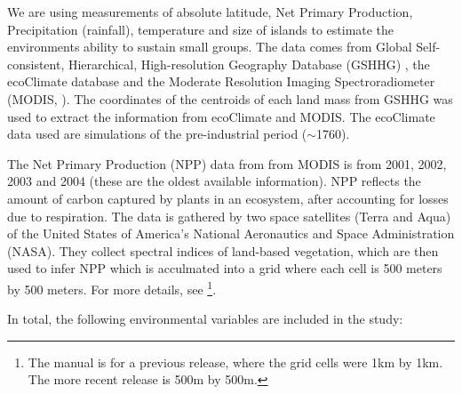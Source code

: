 \documentclass[unnumsec,webpdf,modern,medium]{oup-authoring-template}
\begin{document}
\begin{appendices}

We are using measurements of absolute latitude, Net Primary Production, Precipitation (rainfall), temperature and size of islands to estimate the environments ability to sustain small groups. The data comes from Global Self-consistent, Hierarchical, High-resolution Geography Database (GSHHG) \citep{wessel1996global}, the ecoClimate database \citep{ecoclimate} and the Moderate Resolution Imaging Spectroradiometer (MODIS, \citet{running2021modis_terra, running2021modis_aqua}). The coordinates of the centroids of each land mass from GSHHG was used to extract the information from ecoClimate and MODIS. The ecoClimate data used are simulations of the pre-industrial period ($\sim$1760).

The Net Primary Production (NPP) data from from MODIS is from 2001, 2002, 2003 and 2004 (these are the oldest available information). NPP reflects the amount of carbon captured by plants in an ecosystem, after accounting for losses due to respiration. The data is gathered by two space satellites (Terra and Aqua) of the United States of America's National Aeronautics and Space Administration (NASA). They collect spectral indices of land-based vegetation, which are then used to infer NPP which is acculmated into a grid where each cell is 500 meters by 500 meters. For more details, see \citet{running2015daily} \footnote{The manual is for a previous release, where the grid cells were 1km by 1km. The more recent release is 500m by 500m.}.

In total, the following environmental variables are included in the study:


\end{appendices}
\end{document}
